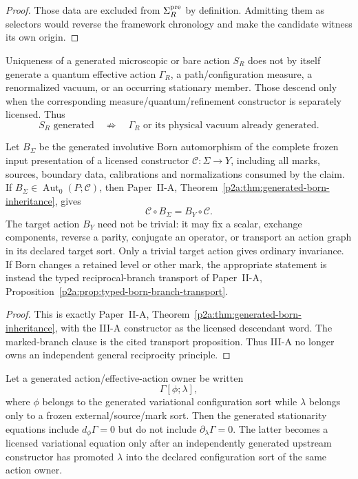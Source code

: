\documentclass[12pt,a4paper]{article}
\begin{document}
\begin{proof}
Those data are excluded from $\Sigma_R^{\rm pre}$ by definition.  Admitting
them as selectors would reverse the framework chronology and make the
candidate witness its own origin.
\end{proof}

\begin{corollary}
\label{p3a:cor:bare-effective-action-firewall}
Uniqueness of a generated microscopic or bare action $S_R$ does not by itself
generate a quantum effective action $\Gamma_R$, a path/configuration measure,
a renormalized vacuum, or an occurring stationary member.  Those descend only
when the corresponding measure/quantum/refinement constructor is separately
licensed.  Thus
\[
 S_R\text{ generated}\quad\not\Rightarrow\quad
 \Gamma_R\text{ or its physical vacuum already generated}.
\]
\end{corollary}

\begin{corollary}
\label{p3a:cor:born-equivariant-constructor-descent}
Let $B_\Sigma$ be the generated involutive Born automorphism of the complete
frozen input presentation of a licensed constructor
$\mathcal C:\Sigma\to Y$, including all marks, sources, boundary data,
calibrations and normalizations consumed by the claim.  If
$B_\Sigma\in\operatorname{Aut}_0(P;\mathcal C)$, then
Paper~II-A, Theorem~\ref{p2a:thm:generated-born-inheritance}, gives
\[
 \boxed{\mathcal C\circ B_\Sigma=B_Y\circ\mathcal C.}
\]
The target action $B_Y$ need not be trivial: it may fix a scalar, exchange
components, reverse a parity, conjugate an operator, or transport an action
graph in its declared target sort.  Only a trivial target action gives
ordinary invariance.  If Born changes a retained level or other mark, the
appropriate statement is instead the typed reciprocal-branch transport of
Paper~II-A, Proposition~\ref{p2a:prop:typed-born-branch-transport}.
\end{corollary}

\begin{proof}
This is exactly Paper~II-A,
Theorem~\ref{p2a:thm:generated-born-inheritance}, with the III-A constructor
as the licensed descendant word.  The marked-branch clause is the cited
transport proposition.  Thus III-A no longer owns an independent general
reciprocity principle.
\end{proof}

\begin{theorem}
\label{p3a:thm:variational-sort-firewall}
Let a generated action/effective-action owner be written
\[
 \Gamma[\phi;\lambda],
\]
where $\phi$ belongs to the generated variational configuration sort while
$\lambda$ belongs only to a frozen external/source/mark sort.  Then the
generated stationarity equations include $d_\phi\Gamma=0$ but do not include
$\partial_\lambda\Gamma=0$.  The latter becomes a licensed variational
equation only after an independently generated upstream constructor has
promoted $\lambda$ into the declared configuration sort of the same action
owner.
\end{theorem}
\end{document}
